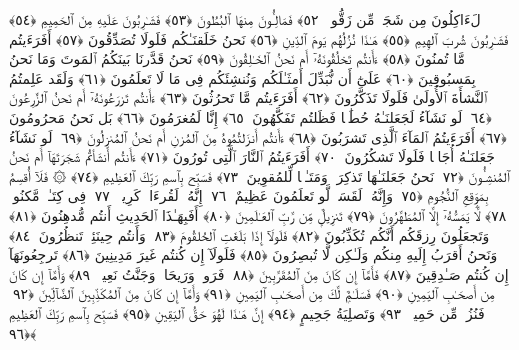 لَءَاكِلُونَ مِن شَجَرٍۢ مِّن زَقُّومٍۢ ﴿٥٢﴾
 فَمَالِـُٔونَ مِنهَا ٱلبُطُونَ ﴿٥٣﴾
 فَشَـٰرِبُونَ عَلَيهِ مِنَ ٱلحَمِيمِ ﴿٥٤﴾
 فَشَـٰرِبُونَ شُربَ ٱلهِيمِ ﴿٥٥﴾
 هَـٰذَا نُزُلُهُم يَومَ ٱلدِّينِ ﴿٥٦﴾
 نَحنُ خَلَقنَـٰكُم فَلَولَا تُصَدِّقُونَ ﴿٥٧﴾
 أَفَرَءَيتُم مَّا تُمنُونَ ﴿٥٨﴾
 ءَأَنتُم تَخلُقُونَهُۥٓ أَم نَحنُ ٱلخَـٰلِقُونَ ﴿٥٩﴾
 نَحنُ قَدَّرنَا بَينَكُمُ ٱلمَوتَ وَمَا نَحنُ بِمَسبُوقِينَ ﴿٦٠﴾
 عَلَىٰٓ أَن نُّبَدِّلَ أَمثَـٰلَكُم وَنُنشِئَكُم فِى مَا لَا تَعلَمُونَ ﴿٦١﴾
 وَلَقَد عَلِمتُمُ ٱلنَّشأَةَ ٱلأُولَىٰ فَلَولَا تَذَكَّرُونَ ﴿٦٢﴾
 أَفَرَءَيتُم مَّا تَحرُثُونَ ﴿٦٣﴾
 ءَأَنتُم تَزرَعُونَهُۥٓ أَم نَحنُ ٱلزَّٰرِعُونَ ﴿٦٤﴾
 لَو نَشَآءُ لَجَعَلنَـٰهُ حُطَٰمًۭا فَظَلتُم تَفَكَّهُونَ ﴿٦٥﴾
 إِنَّا لَمُغرَمُونَ ﴿٦٦﴾
 بَل نَحنُ مَحرُومُونَ ﴿٦٧﴾
 أَفَرَءَيتُمُ ٱلمَآءَ ٱلَّذِى تَشرَبُونَ ﴿٦٨﴾
 ءَأَنتُم أَنزَلتُمُوهُ مِنَ ٱلمُزنِ أَم نَحنُ ٱلمُنزِلُونَ ﴿٦٩﴾
 لَو نَشَآءُ جَعَلنَـٰهُ أُجَاجًۭا فَلَولَا تَشكُرُونَ ﴿٧٠﴾
 أَفَرَءَيتُمُ ٱلنَّارَ ٱلَّتِى تُورُونَ ﴿٧١﴾
 ءَأَنتُم أَنشَأتُم شَجَرَتَهَآ أَم نَحنُ ٱلمُنشِـُٔونَ ﴿٧٢﴾
 نَحنُ جَعَلنَـٰهَا تَذكِرَةًۭ وَمَتَـٰعًۭا لِّلمُقوِينَ ﴿٧٣﴾
 فَسَبِّح بِٱسمِ رَبِّكَ ٱلعَظِيمِ ﴿٧٤﴾
 ۞ فَلَآ أُقسِمُ بِمَوَٟقِعِ ٱلنُّجُومِ ﴿٧٥﴾
 وَإِنَّهُۥ لَقَسَمٌۭ لَّو تَعلَمُونَ عَظِيمٌ ﴿٧٦﴾
 إِنَّهُۥ لَقُرءَانٌۭ كَرِيمٌۭ ﴿٧٧﴾
 فِى كِتَـٰبٍۢ مَّكنُونٍۢ ﴿٧٨﴾
 لَّا يَمَسُّهُۥٓ إِلَّا ٱلمُطَهَّرُونَ ﴿٧٩﴾
 تَنزِيلٌۭ مِّن رَّبِّ ٱلعَـٰلَمِينَ ﴿٨٠﴾
 أَفَبِهَـٰذَا ٱلحَدِيثِ أَنتُم مُّدهِنُونَ ﴿٨١﴾
 وَتَجعَلُونَ رِزقَكُم أَنَّكُم تُكَذِّبُونَ ﴿٨٢﴾
 فَلَولَآ إِذَا بَلَغَتِ ٱلحُلقُومَ ﴿٨٣﴾
 وَأَنتُم حِينَئِذٍۢ تَنظُرُونَ ﴿٨٤﴾
 وَنَحنُ أَقرَبُ إِلَيهِ مِنكُم وَلَـٰكِن لَّا تُبصِرُونَ ﴿٨٥﴾
 فَلَولَآ إِن كُنتُم غَيرَ مَدِينِينَ ﴿٨٦﴾
 تَرجِعُونَهَآ إِن كُنتُم صَـٰدِقِينَ ﴿٨٧﴾
 فَأَمَّآ إِن كَانَ مِنَ ٱلمُقَرَّبِينَ ﴿٨٨﴾
 فَرَوحٌۭ وَرَيحَانٌۭ وَجَنَّتُ نَعِيمٍۢ ﴿٨٩﴾
 وَأَمَّآ إِن كَانَ مِن أَصحَـٰبِ ٱليَمِينِ ﴿٩٠﴾
 فَسَلَـٰمٌۭ لَّكَ مِن أَصحَـٰبِ ٱليَمِينِ ﴿٩١﴾
 وَأَمَّآ إِن كَانَ مِنَ ٱلمُكَذِّبِينَ ٱلضَّآلِّينَ ﴿٩٢﴾
 فَنُزُلٌۭ مِّن حَمِيمٍۢ ﴿٩٣﴾
 وَتَصلِيَةُ جَحِيمٍ ﴿٩٤﴾
 إِنَّ هَـٰذَا لَهُوَ حَقُّ ٱليَقِينِ ﴿٩٥﴾
 فَسَبِّح بِٱسمِ رَبِّكَ ٱلعَظِيمِ ﴿٩٦﴾
 
